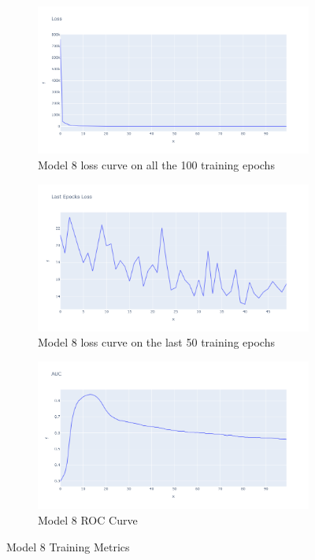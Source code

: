 \begin{figure}[H]%
    \centering
    \begin{subfigure}{0.49\textwidth}
        \centering
        \includegraphics[width=\linewidth]{figures/ev/do_4_tloss.png}
        \caption{Model 8 loss curve on all the 100 training epochs}
    \label{fig:do_4_tloss}
    \end{subfigure}
    \begin{subfigure}{0.49\textwidth}
        \centering
         \includegraphics[width=\linewidth]{figures/ev/do_4_ploss.png}
        \caption{Model 8 loss curve on the last 50 training epochs}
    \label{fig:do_4_ploss}
    \end{subfigure}
    \begin{subfigure}{0.49\textwidth}
        \centering
        \includegraphics[width=\linewidth]{figures/ev/do_4_auc.png}
        \caption{Model 8 ROC Curve}
    \label{fig:do_4_auc}
    \end{subfigure}
    \captionsetup{font=large}
\caption{Model 8 Training Metrics}
\label{fig:8_tr}
\end{figure}

